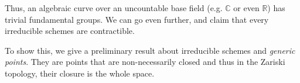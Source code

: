 \documentclass{article}
\theoremstyle{plain}
\newtheorem{lemma}[theorem]{Lemma}
\theoremstyle{definition}
\begin{document}
\noindent Thus, an algebraic curve over an uncountable base field (e.g. $\mathbb{C}$ or even $\mathbb{R}$) has trivial fundamental groups. 
We can go even further, and claim that every irreducible schemes are contractible.

To show this, we give a preliminary result about irreducible schemes and \textit{generic points}. 
They are points that are non-necessarily closed and thus in the Zariski topology, their closure is the whole space.

\end{document}

